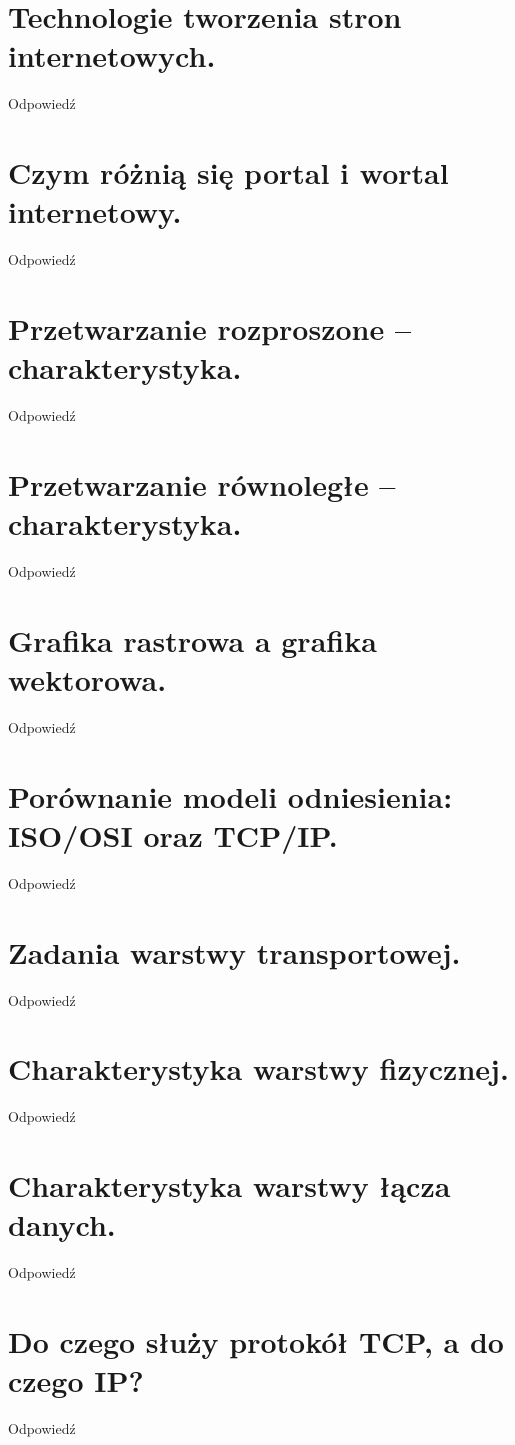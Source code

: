 \documentclass[12pt,a4paper]{article}
\begin{document}
	\section{Technologie tworzenia stron internetowych.}
	Odpowiedź

	\section{Czym różnią się portal i wortal internetowy.}
	Odpowiedź

	\section{Przetwarzanie rozproszone – charakterystyka.}
	Odpowiedź

	\section{Przetwarzanie równoległe – charakterystyka.}
	Odpowiedź

	\section{Grafika rastrowa a grafika wektorowa.}
	Odpowiedź

	\section{Porównanie modeli odniesienia: ISO/OSI oraz TCP/IP.}
	Odpowiedź

	\section{Zadania warstwy transportowej.}
	Odpowiedź

	\section{Charakterystyka warstwy fizycznej.}
	Odpowiedź

	\section{Charakterystyka warstwy łącza danych.}
	Odpowiedź

	\section{Do czego służy protokół TCP, a do czego IP?}
	Odpowiedź
\end{document}
